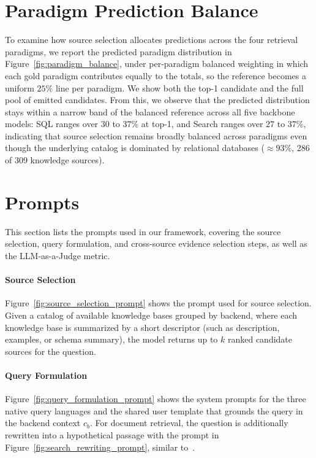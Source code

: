 \section{Paradigm Prediction Balance}
\label{sec:appendix_paradigm_balance}
To examine how source selection allocates predictions across the four retrieval paradigms, we report the predicted paradigm distribution in Figure~\ref{fig:paradigm_balance}, under per-paradigm balanced weighting in which each gold paradigm contributes equally to the totals, so the reference becomes a uniform $25\%$ line per paradigm. We show both the top-1 candidate and the full pool of emitted candidates. From this, we observe that the predicted distribution stays within a narrow band of the balanced reference across all five backbone models: SQL ranges over $30$ to $37\%$ at top-1, and Search ranges over $27$ to $37\%$, indicating that source selection remains broadly balanced across paradigms even though the underlying catalog is dominated by relational databases ($\approx 93\%$, 286 of 309 knowledge sources).



\section{Prompts}
\label{sec:appendix_prompts}
This section lists the prompts used in our framework, covering the source selection, query formulation, and cross-source evidence selection steps, as well as the LLM-as-a-Judge metric.

\vspace{-0.1in}
\paragraph{Source Selection}
Figure~\ref{fig:source_selection_prompt} shows the prompt used for source selection. Given a catalog of available knowledge bases grouped by backend, where each knowledge base is summarized by a short descriptor (such as description, examples, or schema summary), the model returns up to $k$ ranked candidate sources for the question.

\vspace{-0.1in}
\paragraph{Query Formulation}
Figure~\ref{fig:query_formulation_prompt} shows the system prompts for the three native query languages and the shared user template that grounds the query in the backend context $c_b$. For document retrieval, the question is additionally rewritten into a hypothetical passage with the prompt in Figure~\ref{fig:search_rewriting_prompt}, similar to~\citet{HyDE}.

